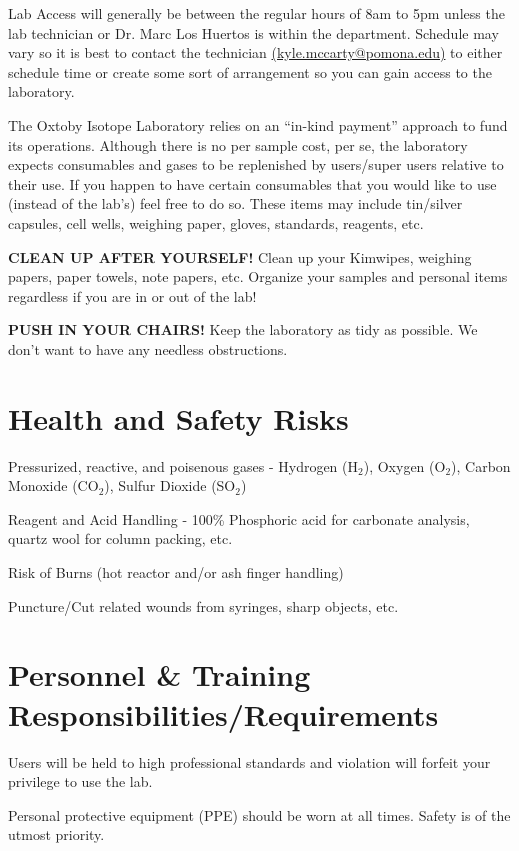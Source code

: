 \documentclass[12pt]{../SOP3}\usepackage[]{graphicx}\usepackage[]{color}
\begin{document}
\NP Lab Access will generally be between the regular hours of 8am to 5pm unless the lab technician or Dr. Marc Los Huertos is within the department. Schedule may vary so it is best to contact the technician \href{mailto:kyle.mccarty@pomona.edu}{(kyle.mccarty@pomona.edu)} to either schedule time or create some sort of arrangement so you can gain access to the laboratory.

\NP The Oxtoby Isotope Laboratory relies on an ``in-kind payment'' approach to fund its operations. Although there is no per sample cost, per se, the laboratory expects consumables and gases to be replenished by users/super users relative to their use. If you happen to have certain consumables that you would like to use (instead of the lab's) feel free to do so. These items may include tin/silver capsules, cell wells, weighing paper, gloves, standards, reagents, etc.

\NP \textbf{CLEAN UP AFTER YOURSELF!} Clean up your Kimwipes, weighing papers, paper towels, note papers, etc. Organize your samples and personal items regardless if you are in or out of the lab!

\NP \textbf{PUSH IN YOUR CHAIRS!} Keep the laboratory as tidy as possible. We don't want to have any needless obstructions.

\section{Health and Safety Risks}

\NP Pressurized, reactive, and poisenous gases - Hydrogen (H$_2$), Oxygen (O$_2$), Carbon Monoxide (CO$_2$), Sulfur Dioxide (SO$_2$)

\NP Reagent and Acid Handling - 100\% Phosphoric acid for carbonate analysis, quartz wool for column packing, etc. 

\NP Risk of Burns (hot reactor and/or ash finger handling)

\NP Puncture/Cut related wounds from syringes, sharp objects, etc.

\section{Personnel \& Training Responsibilities/Requirements}

\NP Users will be held to high professional standards and violation will forfeit your privilege to use the lab.

\NP Personal protective equipment (PPE) should be worn at all times. Safety is of the utmost priority.
\end{document}
